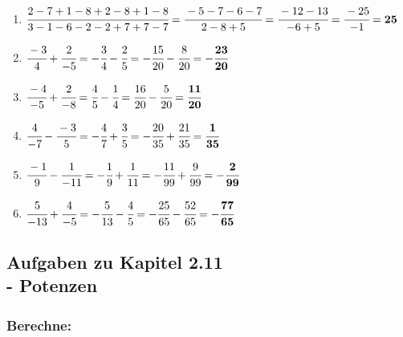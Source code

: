 \documentclass[a4paper,10pt]{article} %
\begin{document}
\begin{enumerate}
  \item \(\cfrac{2 - 7 + 1 - 8 + 2 - 8 + 1 - 8}{3 - 1 - 6 - 2 - 2 + 7 + 7 - 7} =
    \cfrac{-5 - 7 - 6 - 7}{2 - 8 + 5} =
    \cfrac{-12 - 13}{-6 + 5} =
    \cfrac{-25}{-1} =
    \mathbf{25}\) %

  \item \(\cfrac{-3}{4} + \cfrac{2}{-5} =
    -\cfrac{3}{4} - \cfrac{2}{5} =
    -\cfrac{15}{20} - \cfrac{8}{20} =
    \mathbf{-\cfrac{23}{20}}\) %

  \item \(\cfrac{-4}{-5} + \cfrac{2}{-8} =
    \cfrac{4}{5} - \cfrac{1}{4} =
    \cfrac{16}{20} - \cfrac{5}{20} =
    \mathbf{\cfrac{11}{20}}\) %

  \item \(\cfrac{4}{-7} - \cfrac{-3}{5} =
    -\cfrac{4}{7} + \cfrac{3}{5} =
    -\cfrac{20}{35} + \cfrac{21}{35} =
    \mathbf{\cfrac{1}{35}}\) %

  \item \(\cfrac{-1}{9} - \cfrac{1}{-11} =
    -\cfrac{1}{9} + \cfrac{1}{11} =
    -\cfrac{11}{99} + \cfrac{9}{99} =
    \mathbf{-\cfrac{2}{99}}\) %

  \item \(\cfrac{5}{-13} + \cfrac{4}{-5} =
    -\cfrac{5}{13} - \cfrac{4}{5} =
    -\cfrac{25}{65} - \cfrac{52}{65} =
    \mathbf{-\cfrac{77}{65}}\) %

\end{enumerate}

\subsection{Aufgaben zu Kapitel 2.11 \\
  - Potenzen}

\subsubsection{Berechne:} %
\end{document}
